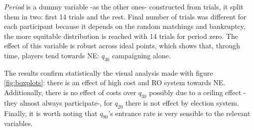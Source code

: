 \textit{Period} is a dummy variable -as the other ones- constructed from trials, it split them in two: first 14 trials and the rest. Final number of trials was different for each participant because it depends on the random matchings and bankruptcy, the more equitable distribution is reached with 14 trials for period zero. The effect of this variable is robust across ideal points, which shows that, through time, players tend towards NE: $q_{30}$ campaigning alone. 

The results confirm statistically the visual analysis made with figure \ref{fig:boxplots}: there is an effect of high cost and RO system towards NE. Additionally, there is no effect of costs over $q_{30}$ possibly due to a ceiling effect -they almost always participate-, for $q_{20}$ there is not effect by election system. Finally, it is worth noting that $q_{80}$'s entrance rate is very sensible to the relevant variables.

